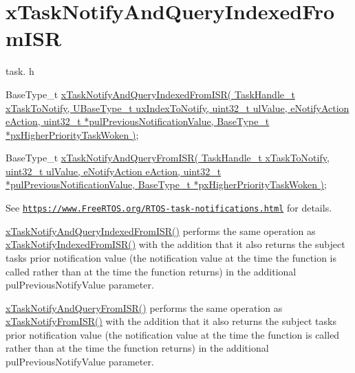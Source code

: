 \hypertarget{group__x_task_notify_and_query_indexed_from_i_s_r}{}\section{x\+Task\+Notify\+And\+Query\+Indexed\+From\+I\+SR}
\label{group__x_task_notify_and_query_indexed_from_i_s_r}
task. h 
\begin{DoxyPre}BaseType\_t \hyperlink{externals_2freertos_2include_2task_8h_a310ee091fef5bf31f23e06bc2a71cfab}{xTaskNotifyAndQueryIndexedFromISR( TaskHandle\_t xTaskToNotify, UBaseType\_t uxIndexToNotify, uint32\_t ulValue, eNotifyAction eAction, uint32\_t *pulPreviousNotificationValue, BaseType\_t *pxHigherPriorityTaskWoken )};\end{DoxyPre}
 
\begin{DoxyPre}BaseType\_t \hyperlink{externals_2freertos_2include_2task_8h_a5c491b42e243a91c7473887d1fb96dd5}{xTaskNotifyAndQueryFromISR( TaskHandle\_t xTaskToNotify, uint32\_t ulValue, eNotifyAction eAction, uint32\_t *pulPreviousNotificationValue, BaseType\_t *pxHigherPriorityTaskWoken )};\end{DoxyPre}


See \href{https://www.FreeRTOS.org/RTOS-task-notifications.html}{\tt https\+://www.\+Free\+R\+T\+O\+S.\+org/\+R\+T\+O\+S-\/task-\/notifications.\+html} for details.

\hyperlink{externals_2freertos_2include_2task_8h_a310ee091fef5bf31f23e06bc2a71cfab}{x\+Task\+Notify\+And\+Query\+Indexed\+From\+I\+S\+R()} performs the same operation as \hyperlink{externals_2freertos_2include_2task_8h_ab86169cb5493142a9e247e2cf2e583e2}{x\+Task\+Notify\+Indexed\+From\+I\+S\+R()} with the addition that it also returns the subject task\textquotesingle{}s prior notification value (the notification value at the time the function is called rather than at the time the function returns) in the additional pul\+Previous\+Notify\+Value parameter.

\hyperlink{externals_2freertos_2include_2task_8h_a5c491b42e243a91c7473887d1fb96dd5}{x\+Task\+Notify\+And\+Query\+From\+I\+S\+R()} performs the same operation as \hyperlink{externals_2freertos_2include_2task_8h_a1ed9129068b96a909356bd0369c5ecb0}{x\+Task\+Notify\+From\+I\+S\+R()} with the addition that it also returns the subject task\textquotesingle{}s prior notification value (the notification value at the time the function is called rather than at the time the function returns) in the additional pul\+Previous\+Notify\+Value parameter. 